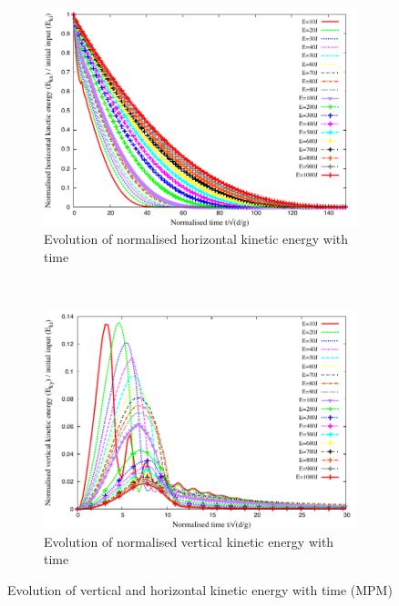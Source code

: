 \begin{figure}[tbhp]
\centering
\begin{subfigure}[b]{0.975\textwidth}
\includegraphics[width=\textwidth]{Normalised_KEx_Slope}
\caption{Evolution of normalised horizontal kinetic energy with time}
\label{fig:Normalised_KEx_Slope}
\end{subfigure}
\\
\begin{subfigure}[b]{0.975\textwidth}
\centering
\includegraphics[width=\textwidth]{Normalised_KEy_Slope}
\caption{Evolution of normalised vertical kinetic energy with time}
\label{fig:Normalised_KEy_Slope}
\end{subfigure}
\caption{Evolution of vertical and horizontal kinetic energy with time (MPM)}
\label{fig:Normalised_KEx_KEy_Slope}
\end{figure}

